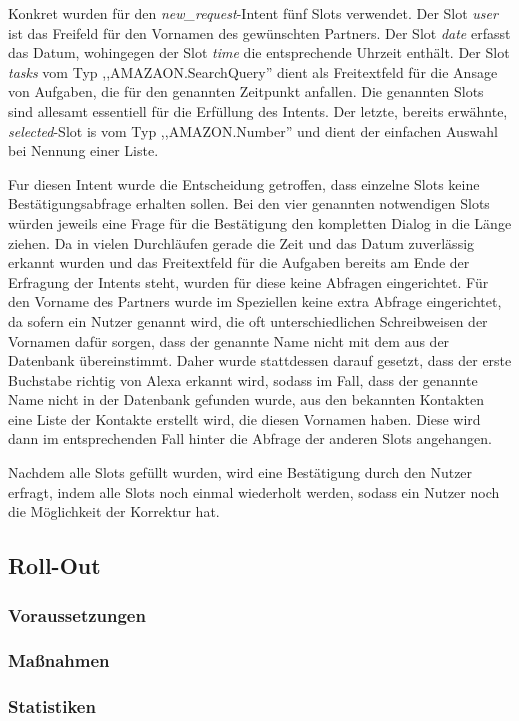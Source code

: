 Konkret wurden für den \textit{new\_request}-Intent fünf Slots verwendet. Der Slot \textit{user} ist das Freifeld für den Vornamen des gewünschten Partners. Der Slot \textit{date} erfasst das Datum, wohingegen der Slot \textit{time} die entsprechende Uhrzeit enthält. Der Slot \textit{tasks} vom Typ ,,AMAZAON.SearchQuery'' dient als Freitextfeld für die Ansage von Aufgaben, die für den genannten Zeitpunkt anfallen. Die genannten Slots sind allesamt essentiell für die Erfüllung des Intents. Der letzte, bereits erwähnte, \textit{selected}-Slot is vom Typ ,,AMAZON.Number'' und dient der einfachen Auswahl bei Nennung einer Liste.

Fur diesen Intent wurde die Entscheidung getroffen, dass einzelne Slots keine Bestätigungsabfrage erhalten sollen. Bei den vier genannten notwendigen Slots würden jeweils eine Frage für die Bestätigung den kompletten Dialog in die Länge ziehen. Da in vielen Durchläufen gerade die Zeit und das Datum zuverlässig erkannt wurden und das Freitextfeld für die Aufgaben bereits am Ende der Erfragung der Intents steht, wurden für diese keine Abfragen eingerichtet. Für den Vorname des Partners wurde im Speziellen keine extra Abfrage eingerichtet, da sofern ein Nutzer genannt wird, die oft unterschiedlichen Schreibweisen der Vornamen dafür sorgen, dass der genannte Name nicht mit dem aus der Datenbank übereinstimmt. Daher wurde stattdessen darauf gesetzt, dass der erste Buchstabe richtig von Alexa erkannt wird, sodass im Fall, dass der genannte Name nicht in der Datenbank gefunden wurde, aus den bekannten Kontakten eine Liste der Kontakte erstellt wird, die diesen Vornamen haben. Diese wird dann im entsprechenden Fall hinter die Abfrage der anderen Slots angehangen.

Nachdem alle Slots gefüllt wurden, wird eine Bestätigung durch den Nutzer erfragt, indem alle Slots noch einmal wiederholt werden, sodass ein Nutzer noch die Möglichkeit der Korrektur hat.

\subsection{Roll-Out}
\subsubsection{Voraussetzungen}
\subsubsection{Maßnahmen}
\subsubsection{Statistiken}

